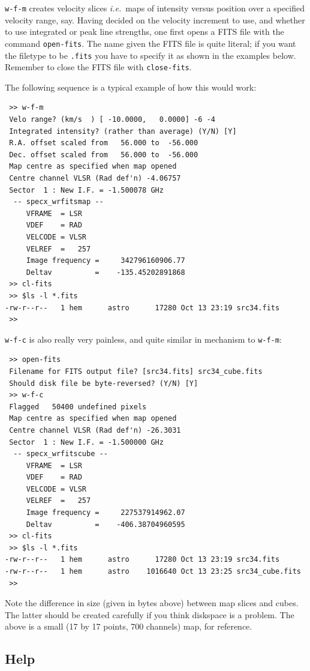 \documentclass[11pt,twoside]{article}
\newcommand{\ie}{{\it i.e.}}
\begin{document}
{\tt w-f-m} creates velocity slices
\ie\ maps of intensity versus position over a specified velocity range, say.
Having decided on the velocity increment to use, and whether to use
integrated or peak line strengths, one first opens a FITS file with
the command
\verb|open-fits|. The name given the FITS file is quite literal; if
you want the filetype to be {\tt .fits} you have to specify it as
shown in the examples below.
Remember to close the FITS file with {\tt close-fits}.

The following sequence is a typical example of how this would work:

\begin{verbatim}
 >> w-f-m
 Velo range? (km/s  ) [ -10.0000,   0.0000] -6 -4
 Integrated intensity? (rather than average) (Y/N) [Y]
 R.A. offset scaled from   56.000 to  -56.000
 Dec. offset scaled from   56.000 to  -56.000
 Map centre as specified when map opened
 Centre channel VLSR (Rad def'n) -4.06757
 Sector  1 : New I.F. = -1.500078 GHz
  -- specx_wrfitsmap --
     VFRAME  = LSR
     VDEF    = RAD
     VELCODE = VLSR
     VELREF  =   257
     Image frequency =     342796160906.77
     Deltav          =    -135.45202891868
 >> cl-fits
 >> $ls -l *.fits
-rw-r--r--   1 hem      astro      17280 Oct 13 23:19 src34.fits
 >>
\end{verbatim}

{\tt w-f-c} is also really very painless, and quite similar in
mechanism to {\tt w-f-m}:
\begin{verbatim}
 >> open-fits
 Filename for FITS output file? [src34.fits] src34_cube.fits
 Should disk file be byte-reversed? (Y/N) [Y]
 >> w-f-c
 Flagged   50400 undefined pixels
 Map centre as specified when map opened
 Centre channel VLSR (Rad def'n) -26.3031
 Sector  1 : New I.F. = -1.500000 GHz
  -- specx_wrfitscube --
     VFRAME  = LSR
     VDEF    = RAD
     VELCODE = VLSR
     VELREF  =   257
     Image frequency =     227537914962.07
     Deltav          =    -406.38704960595
 >> cl-fits
 >> $ls -l *.fits
-rw-r--r--   1 hem      astro      17280 Oct 13 23:19 src34.fits
-rw-r--r--   1 hem      astro    1016640 Oct 13 23:25 src34_cube.fits
 >>
\end{verbatim}

Note the difference in size (given in bytes above) between map slices
and cubes. The latter should be created carefully if you think
diskspace is a problem. The above is a small (17 by 17 points, 700
channels) map, for reference.

\subsection{Help}
\label{sec:specx_14}
\end{document}
